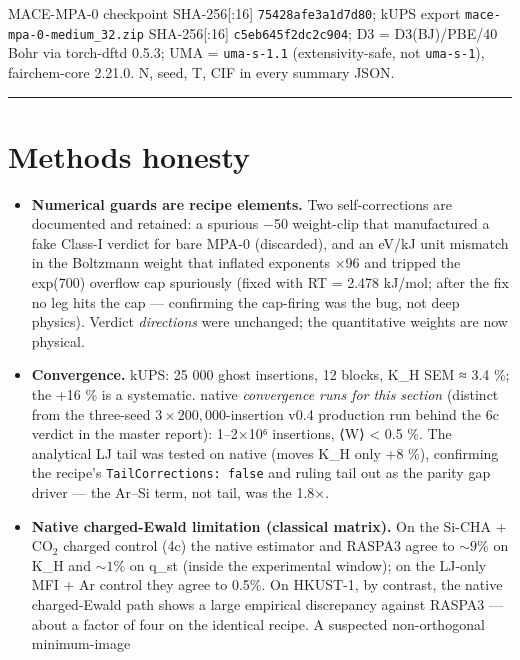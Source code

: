 MACE-MPA-0 checkpoint SHA-256{[}:16{]} \texttt{75428afe3a1d7d80}; kUPS
export \texttt{mace-mpa-0-medium\_32.zip} SHA-256{[}:16{]}
\texttt{c5eb645f2dc2c904}; D3 = D3(BJ)/PBE/40 Bohr via torch-dftd 0.5.3;
UMA = \texttt{uma-s-1.1} (extensivity-safe, not \texttt{uma-s-1}),
fairchem-core 2.21.0. N, seed, T, CIF in every summary JSON.

\begin{center}\rule{0.5\linewidth}{0.5pt}\end{center}

\section{Methods honesty}\label{methods-honesty}

\begin{itemize}
\tightlist
\item
  \textbf{Numerical guards are recipe elements.} Two self-corrections
  are documented and retained: a spurious −50 weight-clip that
  manufactured a fake Class-I verdict for bare MPA-0 (discarded), and an
  eV/kJ unit mismatch in the Boltzmann weight that inflated exponents
  ×96 and tripped the exp(700) overflow cap spuriously (fixed with RT =
  2.478 kJ/mol; after the fix no leg hits the cap --- confirming the
  cap-firing was the bug, not deep physics). Verdict \emph{directions}
  were unchanged; the quantitative weights are now physical.
\item
  \textbf{Convergence.} kUPS: 25 000 ghost insertions, 12 blocks, K\_H
  SEM ≈ 3.4 \%; the +16 \% is a systematic. native \emph{convergence
  runs for this section} (distinct from the three-seed
  \(3\times200{,}000\)-insertion v0.4 production run behind the 6c
  verdict in the master report): 1--2×10⁶ insertions,
  ⟨W⟩ \textless{} 0.5 \%. The analytical LJ tail was tested on native
  (moves K\_H only +8 \%), confirming the recipe's
  \texttt{TailCorrections:\ false} and ruling tail out as the parity gap
  driver --- the Ar--Si term, not tail, was the 1.8×.
\item
  \textbf{Native charged-Ewald limitation (classical matrix).} On the
  Si-CHA + CO\(_2\) charged control (4c) the native estimator and RASPA3
  agree to \(\sim\!9\%\) on K\_H and \(\sim\!1\%\) on q\_st (inside the
  experimental window); on the LJ-only MFI + Ar control they agree to
  0.5\%. On HKUST-1, by contrast, the native charged-Ewald path shows a
  large empirical discrepancy against RASPA3 --- about a factor of four on
  the identical recipe. A suspected non-orthogonal minimum-image

\end{itemize}

